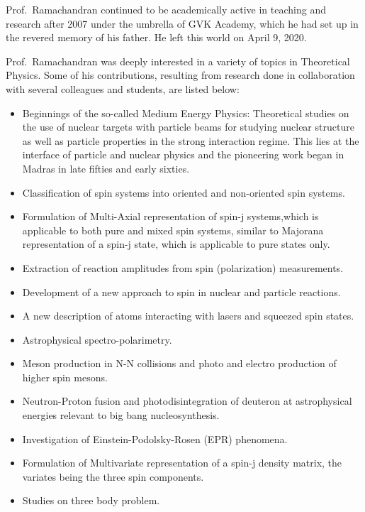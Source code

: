 Prof.\ Ramachandran continued to be academically active in teaching and research after 2007 under the umbrella of GVK Academy, which he had set up in the revered memory of his father. He left this world on April 9, 2020.

Prof.\ Ramachandran was deeply interested in a variety of topics in Theoretical Physics. Some of his contributions, resulting from research done in collaboration with several colleagues and students, are listed below:
\begin{itemize}
\item Beginnings of the so-called Medium Energy Physics: Theoretical studies on the use of nuclear targets with particle beams for studying nuclear structure as well as particle properties in the strong interaction regime. This lies at the interface of particle and nuclear physics and the pioneering work began in Madras in late fifties and early sixties.

\item Classification of spin systems into oriented and non-oriented spin systems.

\item Formulation of Multi-Axial representation of spin-j systems,\break which is applicable to both pure and mixed spin systems, similar to Majorana representation of a spin-j state, which is applicable to pure states only.

\item Extraction of reaction amplitudes from spin (polarization) measurements.

\item Development of a new approach to spin in nuclear and particle reactions.

\item A new description of atoms interacting with lasers and squeezed spin states.

\item Astrophysical spectro-polarimetry.

\item Meson production in N-N collisions and photo and electro production of higher spin mesons.

\item Neutron-Proton fusion and photodisintegration of deuteron at astrophysical energies relevant to big bang nucleosynthesis.

\item Investigation of Einstein-Podolsky-Rosen (EPR) phenomena.

\item Formulation of Multivariate representation of a spin-j density matrix, the variates being the three spin components.

\item Studies on three body problem.
\end{itemize}


